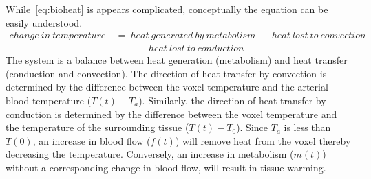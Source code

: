     While~\cref{eq:bioheat} is appears complicated, conceptually the equation can be easily understood.
    \begin{align}    
      \label{eq:soteroexplaiend}
      change\ in\ temperature\ &=\ heat\ generated\ by\ metabolism\ -\ heat\ lost\ to\ convection\ \nonumber \\
      &\qquad {} -\ heat\ lost\ to\ conduction
    \end{align}
    The system is a balance between heat generation (metabolism) and heat transfer (conduction and convection).  The direction of heat transfer by convection is determined by the difference between the voxel temperature and the arterial blood temperature ($T(t) - T_a$).  Similarly, the direction of heat transfer by conduction is determined by the difference between the voxel temperature and the temperature of the surrounding tissue ($T(t) - T_0$).  Since $T_a$ is less than $T(0)$, an increase in blood flow ($f(t)$) will remove heat from the voxel thereby decreasing the temperature.  Conversely, an increase in metabolism ($m(t)$) without a corresponding change in blood flow, will result in tissue warming.  
    
    
    
